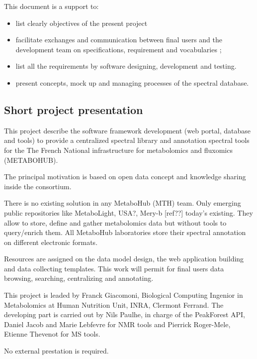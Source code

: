 This document is a support to:
\begin{itemize}
	\item list clearly objectives of the present project
	\item facilitate exchanges and communication between final users and the development team on specifications, requirement and vocabularies ;
	\item list all the requirements by software designing, development and testing.
	\item present concepts, mock up and managing processes of the spectral database.
\end{itemize} 

\subsection{Short project presentation}
\hspace*{\parindent}
This project describe the software framework development (web portal, database and tools) to provide a centralized spectral library  and annotation spectral tools for the The French National infrastructure for metabolomics and fluxomics (METABOHUB).

The principal motivation is based on open data concept and knowledge sharing inside the consortium.

There is no existing solution in any MetaboHub (MTH) team. Only emerging public repositories like {\color{red} MetaboLight, USA?, Mery-b [ref??]} today's existing. They allow to store, define and gather metabolomics data but without tools to query/enrich them. All MetaboHub laboratories store their spectral annotation on different  electronic formats.

Resources are assigned on the data model design, the web application building and data collecting templates. This work will permit for final users data browsing, searching, centralizing and annotating.

This project is leaded by Franck Giacomoni, Biological Computing Ingenior in Metabolomics at Human Nutrition Unit, INRA, Clermont Ferrand. The developing part is carried out by Nils Paulhe, in charge of the PeakForest API, Daniel Jacob and Marie Lebfevre for NMR tools and Pierrick Roger-Mele, Etienne Thevenot for MS tools.

No external prestation is required.


